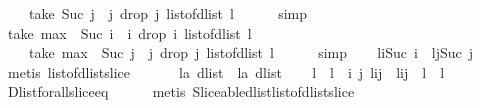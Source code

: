 \begin{isabellebody}
\ \ \ \ take\ {\isacharparenleft}Suc\ j\ {\isacharminus}\ j{\isacharparenright}\ {\isacharparenleft}drop\ j\ {\isacharparenleft}list{\isacharunderscore}of{\isacharunderscore}dlist\ l{\isacharparenright}{\isacharparenright}{\isachardoublequoteclose}\isanewline
\ \ \ \ \isamarkupfalse%
\ simp\isanewline
\ \ \isamarkupfalse%
\ {\isachardoublequoteopen}take\ {\isacharparenleft}max\ {}\ {\isacharparenleft}Suc\ i\ {\isacharminus}\ i{\isacharparenright}{\isacharparenright}\ {\isacharparenleft}drop\ i\ {\isacharparenleft}list{\isacharunderscore}of{\isacharunderscore}dlist\ l{\isacharparenright}{\isacharparenright}\ {\isasymnoteq}\ \isanewline
\ \ \ \ take\ {\isacharparenleft}max\ {}\ {\isacharparenleft}Suc\ j\ {\isacharminus}\ j{\isacharparenright}{\isacharparenright}\ {\isacharparenleft}drop\ j\ {\isacharparenleft}list{\isacharunderscore}of{\isacharunderscore}dlist\ l{\isacharparenright}{\isacharparenright}{\isachardoublequoteclose}\isanewline
\ \ \ \ \isamarkupfalse%
\ simp\isanewline
\ \ \isamarkupfalse%
\ {\isachardoublequoteopen}l{\isasymdagger}i{\isachardot}{\isachardot}Suc\ i\ {\isasymnoteq}\ l{\isasymdagger}j{\isachardot}{\isachardot}Suc\ j{\isachardoublequoteclose}\ \isanewline
\ \ \isamarkupfalse%
\ {\isacharparenleft}metis\ list{\isacharunderscore}of{\isacharunderscore}dlist{\isacharunderscore}slice{\isacharparenright}\isanewline
\ \ \isamarkupfalse%
\isanewline
\ \ \isamarkupfalse%
\ l{}{\isacharcolon}{\isacharcolon}{\isachardoublequoteopen}{\isacharprime}a\ dlist{\isachardoublequoteclose}\ \ l{}{\isacharcolon}{\isacharcolon}{\isachardoublequoteopen}{\isacharprime}a\ dlist{\isachardoublequoteclose}\isanewline
\ \ \isamarkupfalse%
\ {\isachardoublequoteopen}{\isacharparenleft}{\isacharhash}l{}{\isacharparenright}\ {\isacharequal}\ {\isacharparenleft}{\isacharhash}l{}{\isacharparenright}\ {\isasymand}\ {\isacharparenleft}{\isasymforall}i\ j{\isachardot}\ l{}{\isasymdagger}i{\isachardot}{\isachardot}j\ {\isacharequal}\ l{}{\isasymdagger}i{\isachardot}{\isachardot}j{\isacharparenright}\ {\isasymlongleftrightarrow}\ {\isacharparenleft}l{}\ {\isacharequal}\ l{}{\isacharparenright}{\isachardoublequoteclose}\ \isanewline
\ \ \ \ \isamarkupfalse%
\ Dlist{\isacharunderscore}forall{\isacharunderscore}slice{\isacharunderscore}eq\isanewline
\ \ \ \ \isamarkupfalse%
\ {\isacharparenleft}metis\ Sliceable{\isacharunderscore}dlist{\isachardot}list{\isacharunderscore}of{\isacharunderscore}dlist{\isacharunderscore}slice{\isacharparenright}\isanewline

\end{isabellebody}
